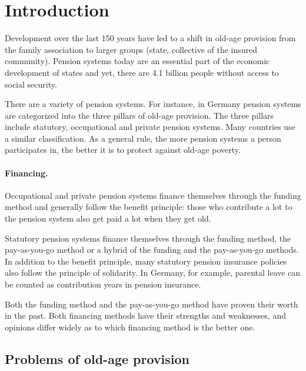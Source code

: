 \section{Introduction}

Development over the last 150 years have led to a shift in old-age provision from the family association to larger groups (state, collective of the insured community). Pension systems today are an essential part of the economic development of states and yet, there are 4.1 billion people without access to social security.\cite{noauthor_universal_2017}

There are a variety of pension systems. For instance, in Germany pension systems are categorized into the three pillars of old-age provision. The three pillars include statutory, occupational and private pension systems. Many countries use a similar classification. As a general rule, the more pension systems a person participates in, the better it is to protect against old-age poverty.

\paragraph{Financing.} Occupational and private pension systems finance themselves through the funding method and generally follow the benefit principle: those who contribute a lot to the pension system also get paid a lot when they get old.

Statutory pension systems finance themselves through the funding method, the pay-as-you-go method or a hybrid of the funding and the pay-as-you-go methods. In addition to the benefit principle, many statutory pension insurance policies also follow the principle of solidarity. In Germany, for example, parental leave can be counted as contribution years in pension insurance.

Both the funding method and the pay-as-you-go method have proven their worth in the past. Both financing methods have their strengths and weaknesses, and opinions differ widely as to which financing method is the better one.


\subsection{Problems of old-age provision}

